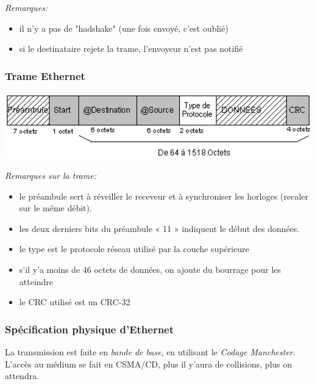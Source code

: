 \documentclass[a4paper, 12pt, french]{article}
\begin{document}
	\emph{Remarques:}
	\begin{itemize}
		\item il n'y a pas de "hadshake" (une fois envoyé, c'est oublié)
		\item si le destinataire rejete la trame, l'envoyeur n'est pas notifié
	\end{itemize}

	\subsubsection{Trame Ethernet}

	\includegraphics[width=13.8cm]{reseau_trame_ethernet}

	\emph{Remarques sur la trame:}
	\begin{itemize}
		\item le préambule sert à réveiller le receveur et à synchroniser les horloges (recaler sur le même débit).
		\item les deux derniers bits du préambule « 11 » indiquent le début des données.
		\item le type est le protocole réseau utilisé par la couche supérieure
		\item s'il y'a moins de 46 octets de données, on ajoute du bourrage pour les atteindre
		\item le CRC utilisé est un CRC-32
	\end{itemize}

	\subsubsection{Spécification physique d'Ethernet}

	La transmission est faite en \emph{bande de base}, en utilisant le \emph{Codage Manchester}. L'accès au médium se fait en CSMA/CD, plus il y'aura de collisions, plus on attendra.
\end{document}
